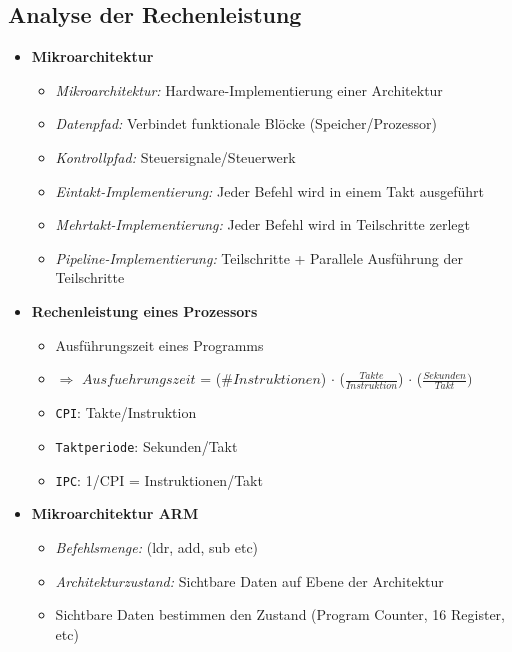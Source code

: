 \subsection{Analyse der Rechenleistung}
    \begin{itemize}
        \item \textbf{Mikroarchitektur}
            \begin{itemize}
                \item \textit{Mikroarchitektur:} Hardware-Implementierung einer Architektur
                \item \textit{Datenpfad:} Verbindet funktionale Blöcke (Speicher/Prozessor)
                \item \textit{Kontrollpfad:} Steuersignale/Steuerwerk
                \item \textit{Eintakt-Implementierung:} Jeder Befehl wird in einem Takt ausgeführt
                \item \textit{Mehrtakt-Implementierung:} Jeder Befehl wird in Teilschritte zerlegt
                \item \textit{Pipeline-Implementierung:} Teilschritte + Parallele Ausführung der Teilschritte
            \end{itemize}
        \item \textbf{Rechenleistung eines Prozessors}
            \begin{itemize}
                \item Ausführungszeit eines Programms
                \item[] $\Rightarrow$ $Ausfuehrungszeit$ = (\#$Instruktionen$) $\cdot$ ($\frac{Takte}{Instruktion}$) $\cdot$ ($\frac{Sekunden}{Takt})$
                \item \texttt{CPI}: Takte/Instruktion
                \item \texttt{Taktperiode}: Sekunden/Takt
                \item \texttt{IPC}: 1/CPI = Instruktionen/Takt
            \end{itemize}
        \item \textbf{Mikroarchitektur ARM}
            \begin{itemize}
                \item \textit{Befehlsmenge:} (ldr, add, sub etc)
                \item \textit{Architekturzustand:} Sichtbare Daten auf Ebene der Architektur
                \item Sichtbare Daten bestimmen den Zustand (Program Counter, 16 Register, etc)

\end{itemize}
\end{itemize}
